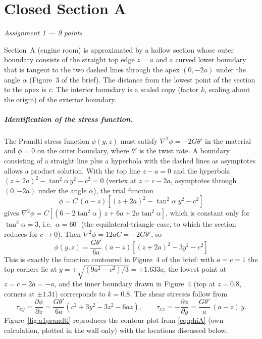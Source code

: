 \chapter{Closed Section A}
\label{ch:assignment1}

\begingroup\itshape Assignment 1 --- 9 points\endgroup

\bigskip
Section~A (engine room) is approximated by a hollow section whose outer boundary consists of the straight top edge $z=a$ and a curved lower boundary that is tangent to the two dashed lines through the apex $(0,-2a)$ under the angle $\alpha$ (Figure~3 of the brief). The distance from the lowest point of the section to the apex is $c$. The interior boundary is a scaled copy (factor $k$, scaling about the origin) of the exterior boundary.

\paragraph{Identification of the stress function.}
The Prandtl stress function $\phi(y,z)$ must satisfy $\nabla^2\phi=-2G\theta'$ in the material and $\phi=0$ on the outer boundary, where $\theta'$ is the twist rate. A boundary consisting of a straight line plus a hyperbola with the dashed lines as asymptotes allows a product solution. With the top line $z-a=0$ and the hyperbola $(z+2a)^2-\tan^2\!\alpha\,y^2-c^2=0$ (vertex at $z=c-2a$, asymptotes through $(0,-2a)$ under the angle $\alpha$), the trial function
\begin{equation}
  \phi = C\,(a-z)\left[(z+2a)^2-\tan^2\!\alpha\;y^2-c^2\right]
\end{equation}
gives $\nabla^2\phi = C\left[(6-2\tan^2\!\alpha)\,z + 6a + 2a\tan^2\!\alpha\right]$, which is constant only for $\tan^2\!\alpha=3$, i.e.\ $\alpha=60^\circ$ (the equilateral-triangle case, to which the section reduces for $c\to0$). Then $\nabla^2\phi=12aC=-2G\theta'$, so
\begin{equation}
  \boxed{\;\phi(y,z)=\frac{G\theta'}{6a}\,(a-z)\left[(z+2a)^2-3y^2-c^2\right]\;}
  \label{eq:phiA}
\end{equation}
This is exactly the function contoured in Figure~4 of the brief: with $a=c=1$ the top corners lie at $y=\pm\sqrt{(9a^2-c^2)/3}=\pm1.633a$, the lowest point at $z=c-2a=-a$, and the inner boundary drawn in Figure~4 (top at $z=0.8$, corners at $\pm1.31$) corresponds to $k=0.8$. The shear stresses follow from
\begin{equation}
  \tau_{xy}=\frac{\partial\phi}{\partial z}=\frac{G\theta'}{6a}\left(c^2+3y^2-3z^2-6az\right),\qquad
  \tau_{xz}=-\frac{\partial\phi}{\partial y}=\frac{G\theta'}{a}\,(a-z)\,y .
  \label{eq:tauA}
\end{equation}
Figure~\ref{fig:a1prandtl} reproduces the contour plot from \eqref{eq:phiA} (own calculation, plotted in the wall only) with the locations discussed below.

